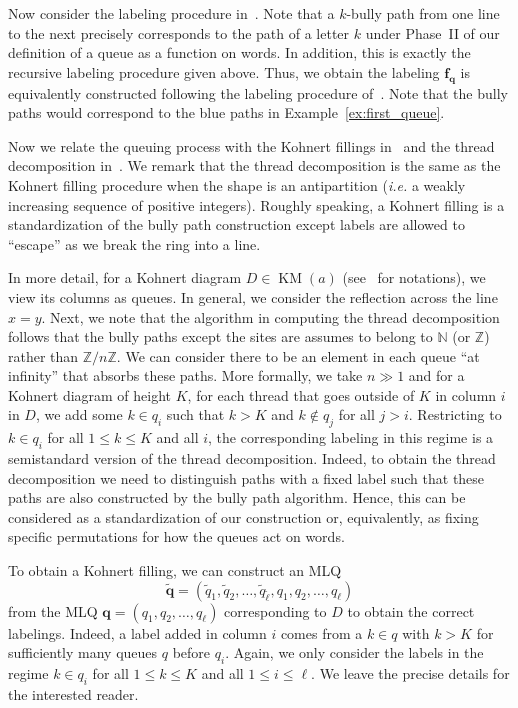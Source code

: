 \documentclass[reqno]{amsart}
\newcommand{\0}{\phantom{c}}
\DeclareMathOperator{\KM}{KM}
\newcommand{\qq}{\mathbf{q}}
\newcommand{\ff}{\mathbf{f}}
\newcommand{\ZZ}{\mathbb{Z}}
\newcommand{\NN}{\mathbb{N}}
\theoremstyle{plain}
\theoremstyle{definition}
\numberwithin{equation}{section}
\newcommand{\Darij}[1]{\todo[size=\tiny,inline,color=red!30]{#1
      \\ \hfill --- Darij}}
\begin{document}
Now consider the labeling procedure in~\cite[\S 2.2]{AasLin17}.
Note that a $k$-bully path from one line to the next precisely corresponds to the path of a letter $k$ under Phase~II of our definition of a queue as a function on words.
In addition, this is exactly the recursive labeling procedure given above.
Thus, we obtain the labeling $\ff_{\qq}$ is equivalently constructed following the labeling procedure of~\cite{AasLin17}.
Note that the bully paths would correspond to the blue paths in Example~\ref{ex:first_queue}.

\Darij{TODO: Connect this with parking functions?}

Now we relate the queuing process with the Kohnert fillings in~\cite[Def.~2.5]{AssSea18} and the thread decomposition in~\cite[Def.~3.5]{AssSea18}.
We remark that the thread decomposition is the same as the Kohnert filling procedure when the shape is an antipartition (\textit{i.e.} a weakly increasing sequence of positive integers).
Roughly speaking, a Kohnert filling is a standardization of the bully path construction except labels are allowed to ``escape'' as we break the ring into a line.

In more detail, for a Kohnert diagram $D \in \KM(a)$ (see~\cite{AssSea18} for notations), we view its columns as queues.
In general, we consider the reflection across the line $x = y$.
Next, we note that the algorithm in computing the thread decomposition follows that the bully paths except the sites are assumes to belong to $\NN$ (or $\ZZ$) rather than $\ZZ/n\ZZ$.
We can consider there to be an element in each queue ``at infinity'' that absorbs these paths.
More formally, we take $n \gg 1$ and for a Kohnert diagram of height $K$, for each thread that goes outside of $K$ in column $i$ in $D$, we add some $k \in q_i$ such that $k > K$ and $k \notin q_j$ for all $j > i$.
Restricting to $k \in q_i$ for all $1 \leq k \leq K$ and all $i$, the corresponding labeling in this regime is a semistandard version of the thread decomposition.
Indeed, to obtain the thread decomposition we need to distinguish paths with a fixed label such that these paths are also constructed by the bully path algorithm.
Hence, this can be considered as a standardization of our construction or, equivalently, as fixing specific permutations for how the queues act on words.

To obtain a Kohnert filling, we can construct an MLQ
\[
\widetilde{\qq} = (\widetilde{q}_1, \widetilde{q}_2, \dotsc, \widetilde{q}_{\widetilde{\ell}}, q_1, q_2, \dotsc, q_{\ell})
\]
from the MLQ $\qq = (q_1, q_2, \dotsc, q_{\ell})$ corresponding to $D$ to obtain the correct labelings.
Indeed, a label added in column $i$ comes from a $k \in q$ with $k > K$ for sufficiently many queues $q$ before $q_i$.
Again, we only consider the labels in the regime $k \in q_i$ for all $1 \leq k \leq K$ and all $1 \leq i \leq \ell$.
We leave the precise details for the interested reader.
\end{document}
